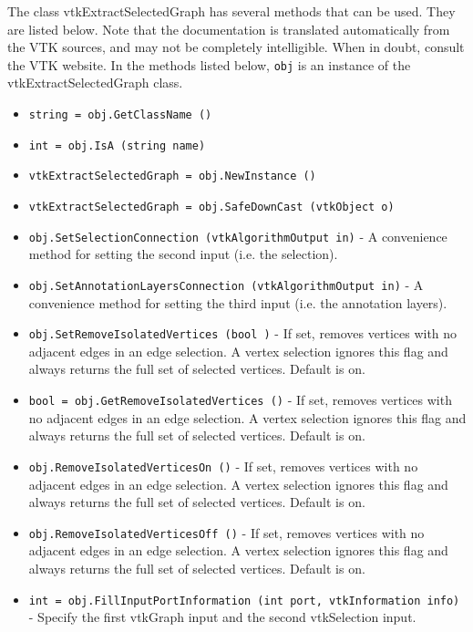 The class vtkExtractSelectedGraph has several methods that can be used.
  They are listed below.
Note that the documentation is translated automatically from the VTK sources,
and may not be completely intelligible.  When in doubt, consult the VTK website.
In the methods listed below, \verb|obj| is an instance of the vtkExtractSelectedGraph class.
\begin{itemize}
\item  \verb|string = obj.GetClassName ()|

\item  \verb|int = obj.IsA (string name)|

\item  \verb|vtkExtractSelectedGraph = obj.NewInstance ()|

\item  \verb|vtkExtractSelectedGraph = obj.SafeDownCast (vtkObject o)|

\item  \verb|obj.SetSelectionConnection (vtkAlgorithmOutput in)| -  A convenience method for setting the second input (i.e. the selection).

\item  \verb|obj.SetAnnotationLayersConnection (vtkAlgorithmOutput in)| -  A convenience method for setting the third input (i.e. the annotation layers).

\item  \verb|obj.SetRemoveIsolatedVertices (bool )| -  If set, removes vertices with no adjacent edges in an edge selection.
 A vertex selection ignores this flag and always returns the full set 
 of selected vertices.  Default is on.

\item  \verb|bool = obj.GetRemoveIsolatedVertices ()| -  If set, removes vertices with no adjacent edges in an edge selection.
 A vertex selection ignores this flag and always returns the full set 
 of selected vertices.  Default is on.

\item  \verb|obj.RemoveIsolatedVerticesOn ()| -  If set, removes vertices with no adjacent edges in an edge selection.
 A vertex selection ignores this flag and always returns the full set 
 of selected vertices.  Default is on.

\item  \verb|obj.RemoveIsolatedVerticesOff ()| -  If set, removes vertices with no adjacent edges in an edge selection.
 A vertex selection ignores this flag and always returns the full set 
 of selected vertices.  Default is on.

\item  \verb|int = obj.FillInputPortInformation (int port, vtkInformation info)| -  Specify the first vtkGraph input and the second vtkSelection input.

\end{itemize}
